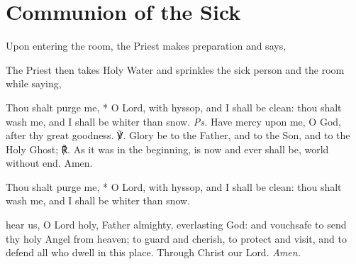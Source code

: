 \fancyhead[RE,LO]{\textit{}}
\section{Communion of the Sick}
\begin{rubric}
    Upon entering the room, the Priest makes preparation and says,
\end{rubric}
\begin{rubric}
    The Priest then takes Holy Water and sprinkles the sick person and the room while saying,
\end{rubric}
Thou shalt purge me, * O Lord, with hyssop, and I shall be clean: thou shalt wash me, and I shall be whiter than snow. \textit{Ps.} Have mercy upon me, O God, after thy great goodness. ℣. Glory be to the Father, and to the Son, and to the Holy Ghost; ℟. As it was in the beginning, is now and ever shall be, world without end. Amen.\par
Thou shalt purge me, * O Lord, with hyssop, and I shall be clean: thou shalt wash me, and I shall be whiter than snow.

{} hear us, O Lord holy, Father almighty, everlasting God: and vouchsafe to send thy holy Angel from heaven; to guard and cherish, to protect and visit, and to defend all who dwell in this place. Through Christ our Lord. \textit{Amen.}

